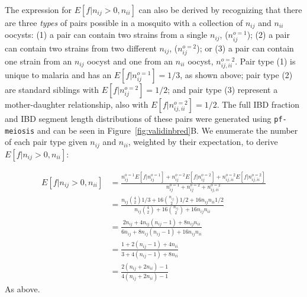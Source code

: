 \documentclass[9pt,lineno]{elife}
\begin{document}
The expression for $E[f|n_{ij} > 0, n_{ii}]$ can also be derived by recognizing that there are three \textit{types} of pairs possible in a mosquito with a collection of $n_{ij}$ and $n_{ii}$ oocysts: (1) a pair can contain two strains from a single $n_{ij}$, ($n^{o=1}_{ij}$); (2) a pair can contain two strains from two different $n_{ij}$, ($n^{o=2}_{ij}$); or (3) a pair can contain one strain from an $n_{ij}$ oocyst and one from an $n_{ii}$ oocyst, $n^{o=2}_{ij, ii}$. Pair type (1) is unique to malaria and has an  $E[f|n^{o=1}_{ij}]=1/3$, as shown above; pair type (2) are standard siblings with $E[f|n^{o=2}_{ij}]=1/2$; and pair type (3) represent a mother-daughter relationship, also with $E[f|n^{o=2}_{ij, ii}]=1/2$. The full IBD fraction and IBD segment length distributions of these pairs were generated using \texttt{pf-meiosis} and can be seen in Figure~\ref{fig:validinbred}B. We enumerate the number of each pair type given $n_{ij}$ and $n_{ii}$, weighted by their expectation, to derive $E[f|n_{ij} > 0, n_{ii}]$:


\begin{align}
E[f|n_{ij} > 0, n_{ii}] & = \frac{n^{o=1}_{ij}E[f|n^{o=1}_{ij}] + n^{o=2}_{ij}E[f|n^{o=2}_{ij}]
+ n^{o=2}_{ij, ii}E[f|n^{o=2}_{ij, ii}]}{n^{o=1}_{ij} + n^{o=2}_{ij} + n^{o=2}_{ij, ii}} \nonumber\\
& = \frac{ n_{ij}{4\choose 2}1/3 + 16{n_{ij}\choose 2}1/2 + 16n_{ij}n_{ii}1/2}{
n_{ij}{4\choose 2} + 16{n_{ij}\choose 2} + 16n_{ij}n_{ii}} \nonumber\\
& = \frac{2n_{ij} + 4n_{ij}(n_{ij} - 1) + 8n_{ij}n_{ii}}{6n_{ij} + 8n_{ij}(n_{ij} - 1) + 16n_{ij}n_{ii}}\nonumber\\
& = \frac{1 + 2(n_{ij} - 1) + 4n_{ii}}{3 + 4(n_{ij} - 1) + 8n_{ii}} \nonumber\\
& = \frac{2(n_{ij} + 2n_{ii}) - 1}{4(n_{ij} + 2n_{ii}) - 1}
\end{align}
As above.

\FloatBarrier


\end{document}
